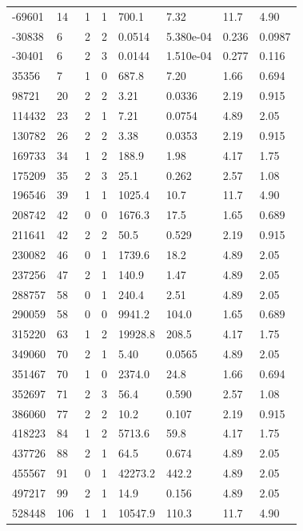 \documentclass[preview]{standalone}
\begin{document}
{{\begin{tabular}{L{1.2cm}C{1.2cm} C{0.3cm}C{0.5cm} C{1.4cm}C{1.4cm} C{1.4cm}C{1.4cm}}
  -69601  &    14  & 1     &  1 &  700.1  & 7.32  & 11.7 &  4.90   \\ 
  -30838  &     6  & 2     &  2 &  0.0514  & 5.380e-04  & 0.236 &  0.0987   \\ 
  -30401  &     6  & 2     &  3 &  0.0144  & 1.510e-04  & 0.277 &  0.116   \\ 
  35356  &     7  & 1     &  0 &  687.8  & 7.20  & 1.66 &  0.694   \\ 
  98721  &    20  & 2     &  2 &  3.21  & 0.0336  & 2.19 &  0.915   \\ 
  114432  &    23  & 2     &  1 &  7.21  & 0.0754  & 4.89 &  2.05   \\ 
  130782  &    26  & 2     &  2 &  3.38  & 0.0353  & 2.19 &  0.915   \\ 
  169733  &    34  & 1     &  2 &  188.9  & 1.98  & 4.17 &  1.75   \\ 
  175209  &    35  & 2     &  3 &  25.1  & 0.262  & 2.57 &  1.08   \\ 
  196546  &    39  & 1     &  1 &  1025.4  & 10.7  & 11.7 &  4.90   \\ 
  208742  &    42  & 0     &  0 &  1676.3  & 17.5  & 1.65 &  0.689   \\ 
  211641  &    42  & 2     &  2 &  50.5  & 0.529  & 2.19 &  0.915   \\ 
  230082  &    46  & 0     &  1 &  1739.6  & 18.2  & 4.89 &  2.05   \\ 
  237256  &    47  & 2     &  1 &  140.9  & 1.47  & 4.89 &  2.05   \\ 
  288757  &    58  & 0     &  1 &  240.4  & 2.51  & 4.89 &  2.05   \\ 
  290059  &    58  & 0     &  0 &  9941.2  & 104.0  & 1.65 &  0.689   \\ 
  315220  &    63  & 1     &  2 &  19928.8  & 208.5  & 4.17 &  1.75   \\ 
  349060  &    70  & 2     &  1 &  5.40  & 0.0565  & 4.89 &  2.05   \\ 
  351467  &    70  & 1     &  0 &  2374.0  & 24.8  & 1.66 &  0.694   \\ 
  352697  &    71  & 2     &  3 &  56.4  & 0.590  & 2.57 &  1.08   \\ 
  386060  &    77  & 2     &  2 &  10.2  & 0.107  & 2.19 &  0.915   \\ 
  418223  &    84  & 1     &  2 &  5713.6  & 59.8  & 4.17 &  1.75   \\ 
  437726  &    88  & 2     &  1 &  64.5  & 0.674  & 4.89 &  2.05   \\ 
  455567  &    91  & 0     &  1 &  42273.2  & 442.2  & 4.89 &  2.05   \\ 
  497217  &    99  & 2     &  1 &  14.9  & 0.156  & 4.89 &  2.05   \\ 
  528448  &   106  & 1     &  1 &  10547.9  & 110.3  & 11.7 &  4.90   \\ 
\hline 
\end{tabular} 

}}
\end{document}
